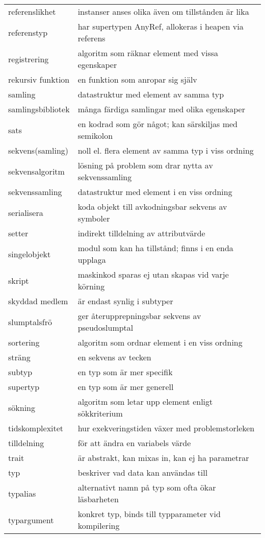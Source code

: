 \begin{tabular}{l|l}
referenslikhet & instanser anses olika även om tillstånden är lika \\
referenstyp & har supertypen AnyRef, allokeras i heapen via referens \\
registrering & algoritm som räknar element med vissa egenskaper \\
rekursiv funktion & en funktion som anropar sig själv \\
samling & datastruktur med element av samma typ \\
samlingsbibliotek & många färdiga samlingar med olika egenskaper \\
sats & en kodrad som gör något; kan särskiljas med semikolon \\
sekvens(samling) & noll el. flera element av samma typ i viss ordning \\
sekvensalgoritm & lösning på problem som drar nytta av sekvenssamling \\
sekvenssamling & datastruktur med element i en viss ordning \\
serialisera & koda objekt till avkodningsbar sekvens av symboler \\
setter & indirekt tilldelning av attributvärde \\
singelobjekt & modul som kan ha tillstånd; finns i en enda upplaga \\
skript & maskinkod sparas ej utan skapas vid varje körning \\
skyddad medlem & är endast synlig i subtyper \\
slumptalsfrö & ger återupprepningsbar sekvens av pseudoslumptal \\
sortering & algoritm som ordnar element i en viss ordning \\
sträng & en sekvens av tecken \\
subtyp & en typ som är mer specifik \\
supertyp & en typ som är mer generell \\
sökning & algoritm som letar upp element enligt sökkriterium \\
tidskomplexitet & hur exekveringstiden växer med problemstorleken \\
tilldelning & för att ändra en variabels värde \\
trait & är abstrakt, kan mixas in, kan ej ha parametrar \\
typ & beskriver vad data kan användas till \\
typalias & alternativt namn på typ som ofta ökar läsbarheten \\
typargument & konkret typ, binds till typparameter vid kompilering \\

\end{tabular}
